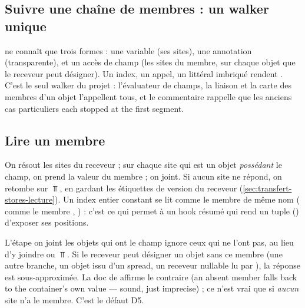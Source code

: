 \subsection{Suivre une chaîne de membres : un walker unique}


 ne connaît que trois formes : une variable (ses sites),
une annotation (transparente), et un accès de champ (les sites du membre, sur
chaque objet que le receveur peut désigner). Un index, un appel, un littéral
imbriqué rendent . C'est le seul walker du projet : l'évaluateur
de champs, la liaison  et la carte des membres d'un objet
l'appellent tous, et le commentaire rappelle que les anciens cas particuliers
 \og each stopped at the first segment\fg{}.

\subsection{Lire un membre}


On résout les sites du receveur ; sur chaque site qui est un objet
\emph{possédant} le champ, on prend la valeur du membre ; on joint. Si aucun
site ne répond, on retombe sur $\Top$, en gardant les étiquettes de version
du receveur (\cref{sec:transfert-stores-lecture}). Un index entier constant
se lit comme le membre de même nom ( comme le membre
, ) : c'est ce
qui permet à un hook résumé qui rend un tuple
() d'exposer ses positions.

\begin{piege}
  L'étape \og on joint les objets qui ont le champ\fg{} ignore ceux qui ne
  l'ont pas, au lieu d'y joindre  ou $\Top$. Si le receveur
  peut désigner un objet sans ce membre (une autre branche, un objet issu
  d'un spread, un receveur nullable lu par ), la réponse est
  sous-approximée. La doc de  affirme le contraire
  (\og an absent member falls back to the container's own value --- sound,
  just imprecise\fg{}) ; ce n'est vrai que si \emph{aucun} site n'a le
  membre. C'est le défaut D5.
\end{piege}

